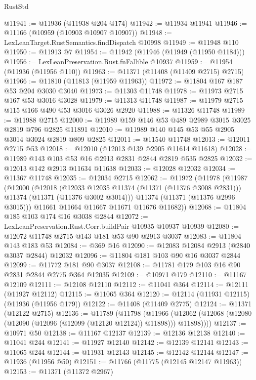 \begin{lexlean}{RustStd}
\begin{coremodule}
{\begin{coremodule}
{{{{{{{{{{{{{{{{{{{{{{{{{{{{{{{{{@11941 := @11936 (@11938 @204 @174)
@11942 := @11934 @11941
@11946 := @11166 (@10959 (@10903 @10907 @10907))
@11948 := LexLeanTarget.RustSemantics.findDispatch @10998
@11949 := @11948 @110
@11950 := @11913 @7
@11954 := @11942 (@11946 (@11949 (@11950 @1184)))
@11956 := LexLeanPreservation.Rust.fnFallible @10937
@11959 := @11954 (@11936 (@11956 @110))
@11963 := @11371 (@11408 (@11409 @2715) @2715)
@11966 := @11810 (@11813 (@11959 @11963))
@11972 := @11804 @167 @187 @53 @204 @3030 @3040
@11973 := @11303 @11748
@11978 := @11973 @2715 @167 @53 @3016 @3028
@11979 := @11313 @11748
@11987 := @11979 @2715 @115 @166 @490 @53 @3016 @3026 @2920
@11988 := @11326 @11748
@11989 := @11988 @2715
@12000 := @11989 @159 @146 @53 @489 @2989 @3015 @3025 @2819 @796 @2825 @11891
@12010 := @11989 @140 @145 @53 @55 @2905 @3014 @3024 @2819 @809 @2825
@12011 := @11540 @11748
@12013 := @12011 @2715 @53
@12018 := @12010 (@12013 @139 @2905 @11614 @11618)
@12028 := @11989 @143 @103 @53 @16 @2913 @2831 @2844 @2819 @535 @2825
@12032 := @12013 @142 @2913 @11634 @11638
@12033 := @12028 @12032
@12034 := @11367 @11748
@12035 := @12034 @2715
@12062 := @11972
    (@11978
      (@11987
        (@12000
          (@12018
            (@12033 @12035 @11374 (@11371 (@11376 @3008 @2831)))
            @11374
            (@11371 (@11376 @3002 @3014)))
          @11374
          (@11371 (@11376 @2996 @3015)))
        @11661
        @11664
        @11667
        @11671
        @11676
        @11682))
@12068 := @11804 @185 @103 @174 @16 @3038 @2844
@12072 := LexLeanPreservation.Rust.Corr.buildPair @10935 @10937 @10939
@12080 := @12072 @11748 @2715 @143 @181 @53 @90 @2913 @3037
@12083 := @11804 @143 @183 @53
@12084 := @369 @16
@12090 := @12083 @12084 @2913 (@2840 @3037 @2844) @12032
@12096 := @11804 @181 @103 @90 @16 @3037 @2844
@12099 := @11772 @181 @90 @3037
@12108 := @11781 @179 @103 @16 @90 @2831 @2844 @2775 @364 @12035
@12109 := @10971 @179
@12110 := @11167 @12109
@12111 := @12108 @12110
@12112 := @11041 @364
@12114 := @12111 (@11927 @12112)
@12115 := @11065 @364
@12120 := @12114 (@11931 @12115) (@11936 (@11956 @179))
@12122 := @11408 (@11409 @2775)
@12124 := @11371 (@12122 @2715)
@12136 := @11789
    (@11798
      (@11966 (@12062 (@12068 (@12080 (@12090 (@12096 (@12099 (@12120 @12124)) @11898))) @11898))))
@12137 := @10971 @50
@12138 := @11167 @12137
@12139 := @12136 @12138
@12140 := @11041 @244
@12141 := @11927 @12140
@12142 := @12139 @12141
@12143 := @11065 @244
@12144 := @11931 @12143
@12145 := @12142 @12144
@12147 := @11936 (@11956 @50)
@12151 := @11766 (@11775 (@12145 @12147 @11963))
@12153 := @11371 (@11372 @2967)
}}}}}}}}}}}}}}}}}}}}}}}}}}}}}}}}}
\end{coremodule}}
\end{coremodule}
\end{lexlean}
